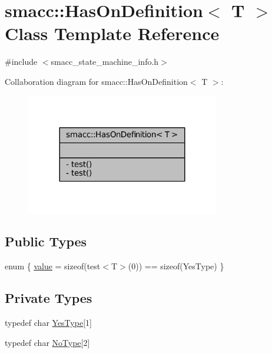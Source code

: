 \hypertarget{classsmacc_1_1HasOnDefinition}{}\section{smacc\+:\+:Has\+On\+Definition$<$ T $>$ Class Template Reference}
\label{classsmacc_1_1HasOnDefinition}


{\ttfamily \#include $<$smacc\+\_\+state\+\_\+machine\+\_\+info.\+h$>$}



Collaboration diagram for smacc\+:\+:Has\+On\+Definition$<$ T $>$\+:
\nopagebreak
\begin{figure}[H]
\begin{center}
\leavevmode
\includegraphics[width=239pt]{classsmacc_1_1HasOnDefinition__coll__graph}
\end{center}
\end{figure}
\subsection*{Public Types}
\begin{DoxyCompactItemize}
\item 
enum \{ \hyperlink{classsmacc_1_1HasOnDefinition_a42ed2a75557706765cc75f0454d612dba0ee3bd0e07973c128ab64f02600c7720}{value} = sizeof(test$<$T$>$(0)) == sizeof(Yes\+Type)
 \}
\end{DoxyCompactItemize}
\subsection*{Private Types}
\begin{DoxyCompactItemize}
\item 
typedef char \hyperlink{classsmacc_1_1HasOnDefinition_af147416543b9d5a19d3dfc4f3f0d42a6}{Yes\+Type}\mbox{[}1\mbox{]}
\item 
typedef char \hyperlink{classsmacc_1_1HasOnDefinition_ab424fbc32a091d6271cabe47eb0725ca}{No\+Type}\mbox{[}2\mbox{]}
\end{DoxyCompactItemize}
